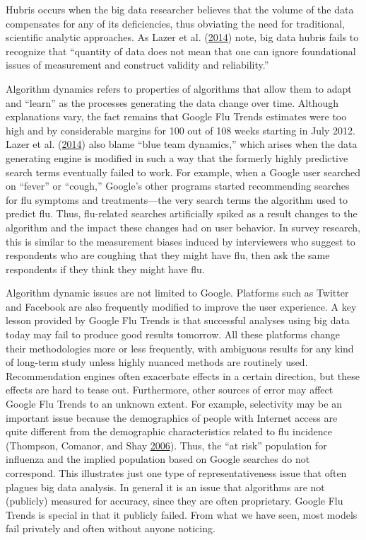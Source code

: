 \documentclass[]{krantz}
\begin{document}
Hubris occurs when the big data researcher believes that the volume of
the data compensates for any of its deficiencies, thus obviating the
need for traditional, scientific analytic approaches. As Lazer et al.
(\protect\hyperlink{ref-lazer2014parable}{2014}) note, big data hubris
fails to recognize that ``quantity of data does not mean that one can
ignore foundational issues of measurement and construct validity and
reliability.''

Algorithm dynamics refers to properties of algorithms that allow them to
adapt and ``learn'' as the processes generating the data change over
time. Although explanations vary, the fact remains that Google Flu
Trends estimates were too high and by considerable margins for 100 out
of 108 weeks starting in July 2012. Lazer et al.
(\protect\hyperlink{ref-lazer2014parable}{2014}) also blame ``blue team
dynamics,'' which arises when the data generating engine is modified in
such a way that the formerly highly predictive search terms eventually
failed to work. For example, when a Google user searched on ``fever'' or
``cough,'' Google's other programs started recommending searches for flu
symptoms and treatments---the very search terms the algorithm used to
predict flu. Thus, flu-related searches artificially spiked as a result
changes to the algorithm and the impact these changes had on user
behavior. In survey research, this is similar to the measurement biases
induced by interviewers who suggest to respondents who are coughing that
they might have flu, then ask the same respondents if they think they
might have flu.

Algorithm dynamic issues are not limited to Google. Platforms such as
Twitter and Facebook are also frequently modified to improve the user
experience. A key lesson provided by Google Flu Trends is that
successful analyses using big data today may fail to produce good
results tomorrow. All these platforms change their methodologies more or
less frequently, with ambiguous results for any kind of long-term study
unless highly nuanced methods are routinely used. Recommendation engines
often exacerbate effects in a certain direction, but these effects are
hard to tease out. Furthermore, other sources of error may affect Google
Flu Trends to an unknown extent. For example, selectivity may be an
important issue because the demographics of people with Internet access
are quite different from the demographic characteristics related to flu
incidence (Thompson, Comanor, and Shay
\protect\hyperlink{ref-thompson2006epidemiology}{2006}). Thus, the ``at
risk'' population for influenza and the implied population based on
Google searches do not correspond. This illustrates just one type of
representativeness issue that often plagues big data analysis. In
general it is an issue that algorithms are not (publicly) measured for
accuracy, since they are often proprietary. Google Flu Trends is special
in that it publicly failed. From what we have seen, most models fail
privately and often without anyone noticing.
\end{document}
